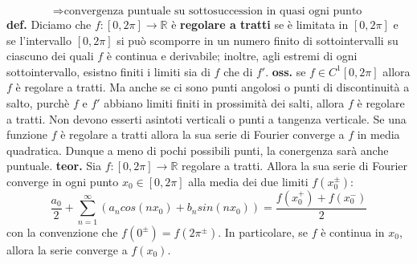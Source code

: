 \[
    \Rightarrow  \text{convergenza puntuale su sottosuccession in quasi ogni punto}\;
\]
\newline
\textbf{def.} Diciamo che $f : [0,2\pi] \rightarrow \mathbb{R}$ è \textbf{regolare a tratti} se è limitata in $[0,2\pi]$ e se l'intervallo $[0,2\pi]$ si può scomporre in un numero finito di sottointervalli su ciascuno dei quali $f$ è continua e derivabile; inoltre, agli estremi di ogni sottointervallo, esistno finiti i limiti sia di $f$ che di $f'$.\newline
\newline
\textbf{oss.} se $f \in C^1[0,2\pi]$ allora $f$ è regolare a tratti. Ma anche se ci sono punti angolosi o punti di discontinuità a salto, purchè $f$ e $f'$ abbiano limiti finiti in prossimità dei salti, allora $f$ è regolare a tratti. Non devono esserti asintoti verticali o punti a tangenza verticale.\newline
\newline
Se una funzione $f$ è regolare a tratti allora la sua serie di Fourier converge a $f$ in media quadratica. Dunque a meno di pochi possibili punti, la conergenza sarà anche puntuale.\newline
\newline
\textbf{teor.} Sia $f: [0,2\pi] \rightarrow \mathbb{R}$ regolare a tratti. Allora la sua serie di Fourier converge in ogni punto $x_0 \in [0,2\pi]$ alla media dei due limiti $f(x_0^{\pm})$:
\[
    \frac{a_0}{2} + \sum_{n=1}^{\infty} \left( a_n cos(nx_0) + b_n sin(nx_0) \right) = \frac{f(x_0^+) + f(x_0^-)}{2}
\]
con la convenzione che $f(0^\pm) = f(2\pi^\pm)$. In particolare, se $f$ è continua in $x_0$, allora la serie converge a $f(x_0)$.
